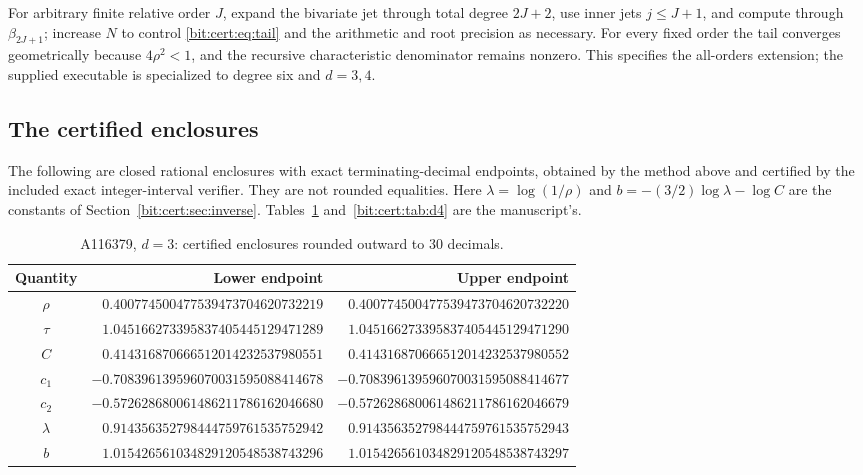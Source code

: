 \documentclass[11pt]{article}
\theoremstyle{definition}\newtheorem{definition}[theorem]{Definition}
\theoremstyle{remark}\newtheorem{remark}[theorem]{Remark}
\begin{document}
For arbitrary finite relative order $J$, expand the bivariate jet through
total degree $2J+2$, use inner jets $j\le J+1$, and compute through
$\beta_{2J+1}$; increase $N$ to control \eqref{bit:cert:eq:tail} and the
arithmetic and root precision as necessary. For every fixed order the tail
converges geometrically because $4\rho^2<1$, and the recursive characteristic
denominator remains nonzero. This specifies the all-orders extension; the
supplied executable is specialized to degree six and $d=3,4$.

\subsection{The certified enclosures}\label{bit:cert:sec:tables}
The following are closed rational enclosures with exact terminating-decimal
endpoints, obtained by the method above and certified by the included exact
integer-interval verifier. They are not rounded equalities. Here
$\lambda=\log(1/\rho)$ and $b=-(3/2)\log\lambda-\log C$ are the constants of
Section~\ref{bit:cert:sec:inverse}. Tables~\ref{bit:cert:tab:d3}
and~\ref{bit:cert:tab:d4} are the manuscript's.

\begin{table}[htbp]
\centering\small
\begin{tabular}{c@{\qquad}r@{\quad}r}\toprule
Quantity & Lower endpoint & Upper endpoint\\\midrule
$\rho$ & $0.400774500477539473704620732219$ & $0.400774500477539473704620732220$\\
$\tau$ & $1.045166273395837405445129471289$ & $1.045166273395837405445129471290$\\
$C$ & $0.414316870666512014232537980551$ & $0.414316870666512014232537980552$\\
$c_1$ & $-0.708396139596070031595088414678$ & $-0.708396139596070031595088414677$\\
$c_2$ & $-0.572628680061486211786162046680$ & $-0.572628680061486211786162046679$\\
$\lambda$ & $0.914356352798444759761535752942$ & $0.914356352798444759761535752943$\\
$b$ & $1.015426561034829120548538743296$ & $1.015426561034829120548538743297$\\
\bottomrule\end{tabular}
\caption{A116379, $d=3$: certified enclosures rounded outward to 30 decimals.}
\label{bit:cert:tab:d3}
\end{table}
\end{document}
